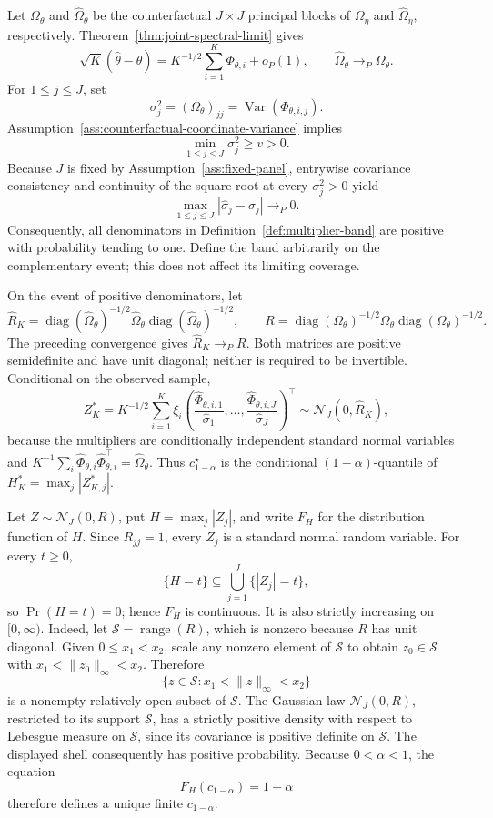 Let \(\Omega_\theta\) and \(\widehat\Omega_\theta\) be the counterfactual \(J\times J\) principal blocks of \(\Omega_\eta\) and \(\widehat\Omega_\eta\), respectively.  Theorem~\ref{thm:joint-spectral-limit} gives
\[
 \sqrt K(\widehat\theta-\theta)
 =K^{-1/2}\sum_{i=1}^K\Phi_{\theta,i}+o_P(1),
 \qquad
 \widehat\Omega_\theta\longrightarrow_P\Omega_\theta.
\]
For \(1\le j\le J\), set
\[
 \sigma_j^2=(\Omega_\theta)_{jj}
 =\operatorname{Var}(\Phi_{\theta,i,j}).
\]
Assumption~\ref{ass:counterfactual-coordinate-variance} implies
\[
 \min_{1\le j\le J}\sigma_j^2\ge v>0.
\]
Because \(J\) is fixed by Assumption~\ref{ass:fixed-panel}, entrywise covariance consistency and continuity of the square root at every \(\sigma_j^2>0\) yield
\[
 \max_{1\le j\le J}|\widehat\sigma_j-\sigma_j|\longrightarrow_P0.
\]
Consequently, all denominators in Definition~\ref{def:multiplier-band} are positive with probability tending to one.  Define the band arbitrarily on the complementary event; this does not affect its limiting coverage.

On the event of positive denominators, let
\[
 \widehat R_K
 =\operatorname{diag}(\widehat\Omega_\theta)^{-1/2}
   \widehat\Omega_\theta
   \operatorname{diag}(\widehat\Omega_\theta)^{-1/2},
 \qquad
 R
 =\operatorname{diag}(\Omega_\theta)^{-1/2}
   \Omega_\theta
   \operatorname{diag}(\Omega_\theta)^{-1/2}.
\]
The preceding convergence gives \(\widehat R_K\to_P R\).  Both matrices are positive semidefinite and have unit diagonal; neither is required to be invertible.  Conditional on the observed sample,
\[
 Z_K^*=K^{-1/2}\sum_{i=1}^K\xi_i
 \left(
   \frac{\widehat\Phi_{\theta,i,1}}{\widehat\sigma_1},
   \ldots,
   \frac{\widehat\Phi_{\theta,i,J}}{\widehat\sigma_J}
 \right)^\top
 \sim\mathcal N_J(0,\widehat R_K),
\]
because the multipliers are conditionally independent standard normal variables and
\(K^{-1}\sum_i\widehat\Phi_{\theta,i}\widehat\Phi_{\theta,i}^{\top}=\widehat\Omega_\theta\).  Thus \(c_{1-\alpha}^\star\) is the conditional \((1-\alpha)\)-quantile of \(H_K^*=\max_j|Z_{K,j}^*|\).

Let \(Z\sim\mathcal N_J(0,R)\), put \(H=\max_j|Z_j|\), and write \(F_H\) for the distribution function of \(H\).  Since \(R_{jj}=1\), every \(Z_j\) is a standard normal random variable.  For every \(t\ge0\),
\[
 \{H=t\}\subseteq\bigcup_{j=1}^J\{|Z_j|=t\},
\]
so \(\Pr(H=t)=0\); hence \(F_H\) is continuous.  It is also strictly increasing on \([0,\infty)\).  Indeed, let \(\mathcal S=\operatorname{range}(R)\), which is nonzero because \(R\) has unit diagonal.  Given \(0\le x_1<x_2\), scale any nonzero element of \(\mathcal S\) to obtain \(z_0\in\mathcal S\) with
\(x_1<\|z_0\|_\infty<x_2\).  Therefore
\[
 \{z\in\mathcal S:x_1<\|z\|_\infty<x_2\}
\]
is a nonempty relatively open subset of \(\mathcal S\).  The Gaussian law \(\mathcal N_J(0,R)\), restricted to its support \(\mathcal S\), has a strictly positive density with respect to Lebesgue measure on \(\mathcal S\), since its covariance is positive definite on \(\mathcal S\).  The displayed shell consequently has positive probability.  Because \(0<\alpha<1\), the equation
\[
 F_H(c_{1-\alpha})=1-\alpha
\]
therefore defines a unique finite \(c_{1-\alpha}\).

